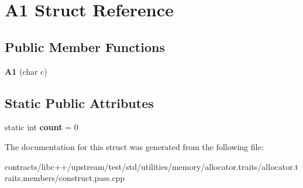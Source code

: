 \hypertarget{struct_a1}{}\section{A1 Struct Reference}
\label{struct_a1}
\subsection*{Public Member Functions}
\begin{DoxyCompactItemize}
\item 
\mbox{\label{struct_a1_a8a63baeaafc182334183b93a06f19c77}} 
{\bfseries A1} (char c)
\end{DoxyCompactItemize}
\subsection*{Static Public Attributes}
\begin{DoxyCompactItemize}
\item 
\mbox{\label{struct_a1_a8db116e77b30df98f5f432d523df1b94}} 
static int {\bfseries count} = 0
\end{DoxyCompactItemize}


The documentation for this struct was generated from the following file\+:\begin{DoxyCompactItemize}
\item 
contracts/libc++/upstream/test/std/utilities/memory/allocator.\+traits/allocator.\+traits.\+members/construct.\+pass.\+cpp\end{DoxyCompactItemize}

